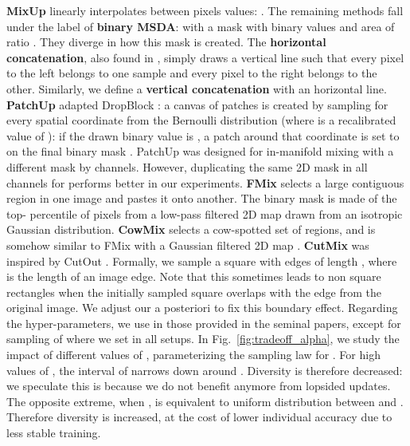 \documentclass[10pt,twocolumn,letterpaper]{article}
\begin{document}
\textbf{MixUp} \cite{zhang2018mixup} linearly interpolates between pixels
values: . The remaining methods
fall under the label of \textbf{binary MSDA}:  with
 a mask with binary values  and area of ratio .
They diverge in how this mask is created. The \textbf{horizontal
  concatenation}, also found in \cite{summers2019improved}, simply draws a
vertical line such that every pixel to the left belongs to one sample and every
pixel to the right belongs to the other. Similarly, we define a \textbf{vertical
  concatenation} with an horizontal line. \textbf{PatchUp}
\cite{faramarzi2020patchup} adapted DropBlock \cite{ghiasi2018dropblock}: a
canvas  of patches is created by sampling for every spatial coordinate from
the Bernoulli distribution  (where  is a recalibrated
value of ): if the drawn binary value is , a patch around that
coordinate is set to  on the final binary mask . PatchUp was
designed for in-manifold mixing with a different mask by channels. However,
duplicating the same 2D mask in all channels for  performs better in our
experiments. \textbf{FMix} \cite{harris2020mix} selects a large contiguous
region in one image and pastes it onto another. The binary mask is made of the
top- percentile of pixels from a low-pass filtered 2D map  drawn
from an isotropic Gaussian distribution. \textbf{CowMix}
\cite{french2019semi,french2020milking} selects a cow-spotted set of regions,
and is somehow similar to FMix with a Gaussian filtered 2D map .
\textbf{CutMix} \cite{yun2019cutmix} was inspired by CutOut
\cite{devries2017improved}. Formally, we sample a square with edges of length
, where  is the length of an image edge. Note that this
sometimes leads to non square rectangles when the initially sampled square
overlaps with the edge from the original image. We adjust our  a
posteriori to fix this boundary effect. Regarding the hyper-parameters, we
use in  those provided in the seminal papers, except for sampling of  where we set  in all setups.%
\label{app:alpha}
In Fig.~\ref{fig:tradeoff_alpha}, we study the impact of different values of
, parameterizing the sampling law for .
For high values of , the interval of  narrows down around .
Diversity is therefore decreased: we speculate this is because we do not benefit
anymore from lopsided updates. The opposite extreme, when , is
equivalent to uniform distribution between  and . Therefore diversity is
increased, at the cost of lower individual accuracy due to less stable training.
\end{document}
